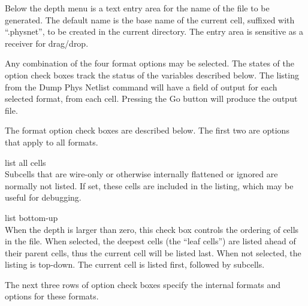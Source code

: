 Below the depth menu is a text entry area for the name of the file to
be generated.  The default name is the base name of the current cell,
suffixed with ``{\vt .physnet}'', to be created in the current
directory.  The entry area is sensitive as a receiver for drag/drop.

Any combination of the four format options may be selected.  The
states of the option check boxes track the status of the variables
described below.  The listing from the {\cb Dump Phys Netlist} command
will have a field of output for each selected format, from each cell. 
Pressing the {\cb Go} button will produce the output file.

The format option check boxes are described below.  The first two are
options that apply to all formats.

\begin{description}
\item{\cb list all cells}\\
Subcells that are wire-only or otherwise internally flattened or
ignored are normally not listed.  If set, these cells are included in
the listing, which may be useful for debugging.

\item{\cb list bottom-up}\\
When the depth is larger than zero, this check box controls the
ordering of cells in the file.  When selected, the deepest cells (the
``leaf cells'') are listed ahead of their parent cells, thus the
current cell will be listed last.  When not selected, the listing is
top-down.  The current cell is listed first, followed by subcells.
\end{description}

The next three rows of option check boxes specify the internal formats
and options for these formats.

